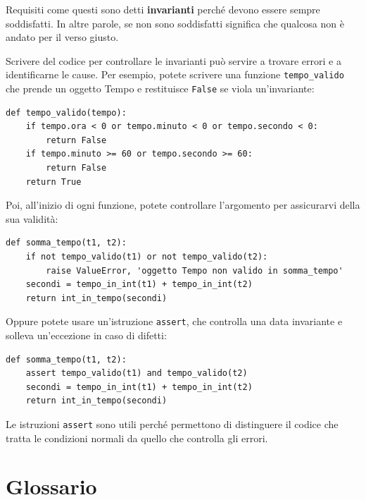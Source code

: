 \documentclass[10pt]{book}
\begin{document}
Requisiti come questi sono detti {\bf invarianti} perché devono essere sempre soddisfatti. In altre parole, se non sono soddisfatti significa che qualcosa non è andato per il verso giusto.

Scrivere del codice per controllare le invarianti può servire a trovare errori e a identificarne le cause. Per esempio, potete scrivere una funzione
 \verb"tempo_valido" che prende un oggetto Tempo e restituisce
{\tt False} se viola un'invariante:

\begin{verbatim}
def tempo_valido(tempo):
    if tempo.ora < 0 or tempo.minuto < 0 or tempo.secondo < 0:
        return False
    if tempo.minuto >= 60 or tempo.secondo >= 60:
        return False
    return True
\end{verbatim}
%
Poi, all'inizio di ogni funzione, potete controllare l'argomento per assicurarvi della sua validità:

\begin{verbatim}
def somma_tempo(t1, t2):
    if not tempo_valido(t1) or not tempo_valido(t2):
        raise ValueError, 'oggetto Tempo non valido in somma_tempo'
    secondi = tempo_in_int(t1) + tempo_in_int(t2)
    return int_in_tempo(secondi)
\end{verbatim}
%
Oppure potete usare un'istruzione {\tt assert}, che controlla una data invariante e solleva un'eccezione in caso di difetti:

\begin{verbatim}
def somma_tempo(t1, t2):
    assert tempo_valido(t1) and tempo_valido(t2)
    secondi = tempo_in_int(t1) + tempo_in_int(t2)
    return int_in_tempo(secondi)
\end{verbatim}
%
Le istruzioni {\tt assert} sono utili perché permettono di distinguere il codice che tratta le condizioni normali da quello che controlla gli errori.


\section{Glossario}
\end{document}
